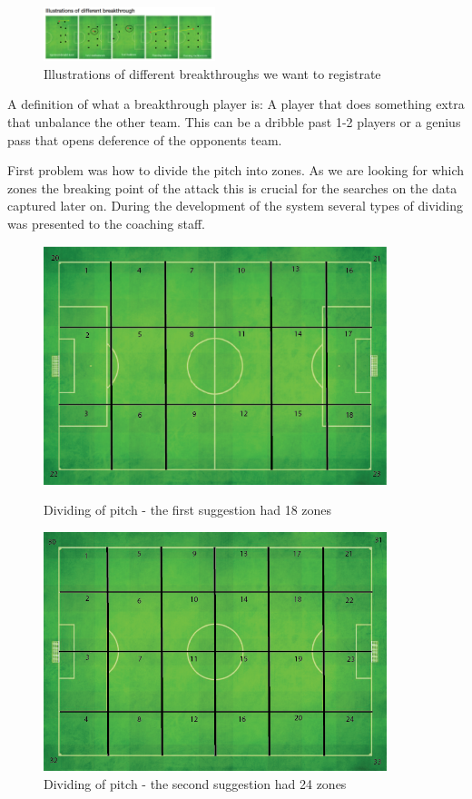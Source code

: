 \begin{figure}[ht!]
\centering
\includegraphics[width=50mm]{images/general/different_breakthroughs.png}
\caption{Illustrations of different breakthroughs we want to registrate}
\end{figure}

A definition of what a breakthrough player is: A player that does something extra that unbalance the other team. This can be a dribble past 1-2 players or a genius pass that opens deference of the opponents team. 

First problem was how to divide the pitch into zones. As we are looking for which zones the breaking point of the attack this is crucial for the searches on the data captured later on. During the development of the system several types of dividing was presented to the coaching staff. 

\begin{figure}[ht!]
\centering
\includegraphics[width=100mm]{images/general/first_zones.png}
\caption{Dividing of pitch - the first suggestion had 18 zones}
\includegraphics[width=100mm]{images/general/second_zones.png}
\caption{Dividing of pitch - the second suggestion had 24 zones}
\end{figure}

